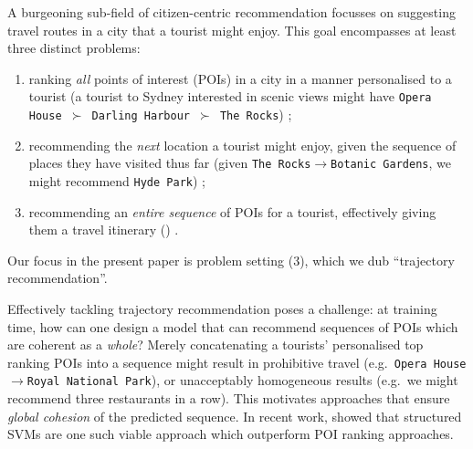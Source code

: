 
A burgeoning sub-field of citizen-centric recommendation focusses on suggesting travel routes in a city that a tourist might enjoy.
This goal encompasses at least three distinct problems:
\begin{enumerate}[(1)]
	\item ranking \emph{all} points of interest (POIs) in a city in a manner personalised to a tourist (\eg a tourist to Sydney interested in scenic views might have {\tt Opera House $\succ$ Darling Harbour $\succ$ The Rocks}) \citep{shi2011personalized,lian2014geomf,hsieh2014mining,yuan2014graph};
	\item recommending the \emph{next} location a tourist might enjoy, given the sequence of places they have visited thus far (\eg given {\tt The Rocks$\to$Botanic Gardens}, we might recommend {\tt Hyde Park}) \citep{fpmc10,ijcai13,zhang2015location};
	\item recommending an \emph{entire sequence} of POIs for a tourist, effectively giving them a travel itinerary () \citep{lu2010photo2trip,ijcai15,lu2012personalized,gioniswsdm14,chen2015tripplanner}.
\end{enumerate}
Our focus in the present paper is problem setting (3), which we dub ``trajectory recommendation''.

Effectively tackling trajectory recommendation poses a challenge:
at training time, how can one design a model that can recommend sequences of POIs which are coherent as a \emph{whole}?
Merely concatenating a tourists' personalised top ranking POIs into a sequence
might result in prohibitive travel (e.g.\ {\tt Opera House$\to$Royal National Park}),
or unacceptably homogeneous results (e.g.\ we might recommend three restaurants in a row).
This motivates approaches that ensure \emph{global cohesion} of the predicted sequence.
In recent work, \citet{Chen:2017} showed that structured SVMs are one such viable approach which outperform POI ranking approaches. %

